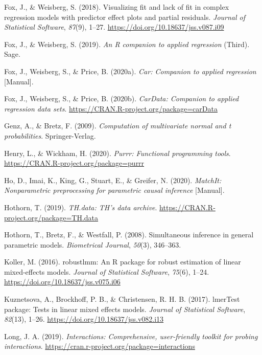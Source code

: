 \documentclass[
  english,
  man, noextraspace]{apa7}
\begin{document}
\begin{appendix}
\leavevmode\hypertarget{ref-R-effects_a}{}%
Fox, J., \& Weisberg, S. (2018). Visualizing fit and lack of fit in
complex regression models with predictor effect plots and partial
residuals. \emph{Journal of Statistical Software}, \emph{87}(9), 1--27.
\url{https://doi.org/10.18637/jss.v087.i09}

\leavevmode\hypertarget{ref-car2019}{}%
Fox, J., \& Weisberg, S. (2019). \emph{An R companion to applied
regression} (Third). Sage.

\leavevmode\hypertarget{ref-R-car}{}%
Fox, J., Weisberg, S., \& Price, B. (2020a). \emph{Car: Companion to
applied regression} {[}Manual{]}.

\leavevmode\hypertarget{ref-R-carData}{}%
Fox, J., Weisberg, S., \& Price, B. (2020b). \emph{CarData: Companion to
applied regression data sets}.
\url{https://CRAN.R-project.org/package=carData}

\leavevmode\hypertarget{ref-R-mvtnorm}{}%
Genz, A., \& Bretz, F. (2009). \emph{Computation of multivariate normal
and t probabilities}. Springer-Verlag.

\leavevmode\hypertarget{ref-R-purrr}{}%
Henry, L., \& Wickham, H. (2020). \emph{Purrr: Functional programming
tools}. \url{https://CRAN.R-project.org/package=purrr}

\leavevmode\hypertarget{ref-R-MatchIt}{}%
Ho, D., Imai, K., King, G., Stuart, E., \& Greifer, N. (2020).
\emph{MatchIt: Nonparametric preprocessing for parametric causal
inference} {[}Manual{]}.

\leavevmode\hypertarget{ref-R-TH.data}{}%
Hothorn, T. (2019). \emph{TH.data: TH's data archive}.
\url{https://CRAN.R-project.org/package=TH.data}

\leavevmode\hypertarget{ref-R-multcomp}{}%
Hothorn, T., Bretz, F., \& Westfall, P. (2008). Simultaneous inference
in general parametric models. \emph{Biometrical Journal}, \emph{50}(3),
346--363.

\leavevmode\hypertarget{ref-R-robustlmm}{}%
Koller, M. (2016). robustlmm: An R package for robust estimation of
linear mixed-effects models. \emph{Journal of Statistical Software},
\emph{75}(6), 1--24. \url{https://doi.org/10.18637/jss.v075.i06}

\leavevmode\hypertarget{ref-R-lmerTest}{}%
Kuznetsova, A., Brockhoff, P. B., \& Christensen, R. H. B. (2017).
lmerTest package: Tests in linear mixed effects models. \emph{Journal of
Statistical Software}, \emph{82}(13), 1--26.
\url{https://doi.org/10.18637/jss.v082.i13}

\leavevmode\hypertarget{ref-R-interactions}{}%
Long, J. A. (2019). \emph{Interactions: Comprehensive, user-friendly
toolkit for probing interactions}.
\url{https://cran.r-project.org/package=interactions}


\end{appendix}
\end{document}
